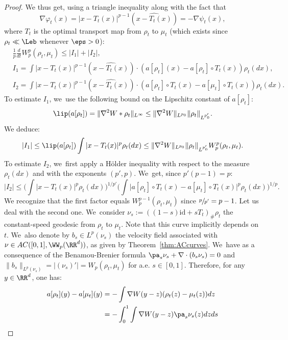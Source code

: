 \begin{proof}
We thus get, using a triangle inequality along with the fact that
\[
\nabla \varphi_t(x) = |x - T_t(x)|^{p-1} (\widehat{x - T_t(x)}) = - \nabla \psi_t(x),
\]
where $T_t$ is the optimal transport map from $\rho_t$ to $\mu_t$ (which exists since $\rho_t \ll \Leb$ whenever $\eps>0$):
\begin{subequations}\label{eq:I12}
\begin{align}
	& \frac 1p \frac{d}{dt} W_p^p(\rho_t, \mu_t) \leq |I_1| + |I_2|, \\
& I_1 = \int |x - T_t(x)|^{p-1} (\widehat{x - T_t(x)}) \cdot (a[\rho_t](x) - a[\rho_t] \circ T_t(x)) \rho_t(dx), \label{eq:I1} \\
& I_2 = \int |x - T_t(x)|^{p-1} (\widehat{x - T_t(x)}) \cdot (a[\rho_t] \circ T_t(x) - a[\mu_t] \circ T_t(x)) \rho_t(dx). \label{eq:I2}
\end{align}
\end{subequations}
To estimate $I_1$, we~use the following bound on the Lipschitz constant of $a[\rho_t]$:
\[
\lip (a[\rho_t]) = \|\nabla^2 W * \rho_t\|_{L^\infty} \leq \|\nabla^2 W\|_{L^{p_0}} \|\rho_t\|_{L^{p_0'}}.
\]
We deduce:
\[
|I_1| \leq \lip (a[\rho_t]) \int |x - T_t(x)|^p \rho_t(dx) \leq \|\nabla^2 W\|_{L^{p_0}} \|\rho_t\|_{L^{p_0'}} W_p^p(\rho_t, \mu_t).
\]
To estimate $I_2$, we~first apply a Hölder inequality with respect to the measure $\rho_t(dx)$ and with the exponents $(p',p)$. We~get, since $p'(p-1)=p$:
\begin{equation}\label{ineq:I2}
|I_2| \leq \bigg( \int |x - T_t(x)|^p \rho_t(dx) \bigg)^{1/p'} \bigg( \int \big|a[\rho_t] \circ T_t(x) - a[\mu_t] \circ T_t(x) \big|^p \rho_t(dx)\bigg)^{1/p}.
\end{equation}
We recognize that the first factor equals $W_p^{p-1}(\rho_t, \mu_t)$ since $\sfrac{p}{p'} = p-1$.
Let us deal with the second one. We~consider $\nu_s := \left((1-s)\text{id} + sT_t\right)_\#\rho_t$ the constant-speed geodesic from $\rho_t$ to $\mu_t$. Note that this curve implicitly depends on $t$. We~also denote by $b_s \in L^p(\nu_s)$ the velocity field associated with $\nu \in AC([0,1], \WW_p(\RR^d))$, as given by Theorem~\ref{thm:ACcurves}. We~have as a consequence of the Benamou-Brenier formula $\pa_s \nu_s + \nabla \cdot(b_s\nu_s) = 0$ and $\|b_s\|_{L^p(\nu_s)} = |(\nu_s)'| = W_p(\rho_t, \mu_t)$ for a.e. $s \in [0,1]$. Therefore, for any $y \in \RR^d$, one has:
\begin{align*}
a[\rho_t](y) - a[\mu_t](y) & = - \int \nabla W(y-z) (\rho_t(z) - \mu_t(z)) dz \\
& = - \int_0^1 \int \nabla W(y-z) \pa_s \nu_s(z) dz ds \\

\end{align*}
\end{proof}

